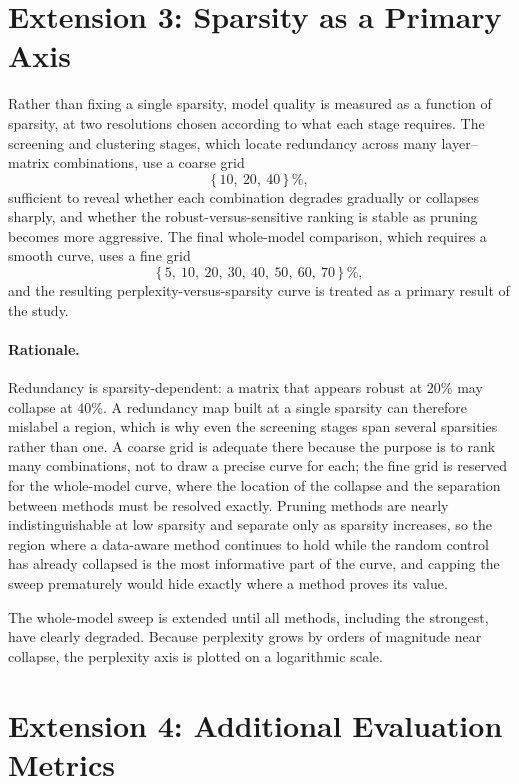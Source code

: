 \documentclass[11pt]{article}
\begin{document}
\section{Extension 3: Sparsity as a Primary Axis}
\label{sec:sparsity}

Rather than fixing a single sparsity, model quality is measured as a function of sparsity, at two
resolutions chosen according to what each stage requires. The screening and clustering stages, which locate
redundancy across many layer--matrix combinations, use a coarse grid
\[
  \{\,10,\ 20,\ 40\,\}\,\%,
\]
sufficient to reveal whether each combination degrades gradually or collapses sharply, and whether the
robust-versus-sensitive ranking is stable as pruning becomes more aggressive. The final whole-model
comparison, which requires a smooth curve, uses a fine grid
\[
  \{\,5,\ 10,\ 20,\ 30,\ 40,\ 50,\ 60,\ 70\,\}\,\%,
\]
and the resulting perplexity-versus-sparsity curve is treated as a primary result of the study.

\paragraph{Rationale.} Redundancy is sparsity-dependent: a matrix that appears robust at 20\% may collapse
at 40\%. A redundancy map built at a single sparsity can therefore mislabel a region, which is why even the
screening stages span several sparsities rather than one. A coarse grid is adequate there because the
purpose is to rank many combinations, not to draw a precise curve for each; the fine grid is reserved for
the whole-model curve, where the location of the collapse and the separation between methods must be
resolved exactly. Pruning methods are nearly indistinguishable at low sparsity and separate only as sparsity
increases, so the region where a data-aware method continues to hold while the random control has already
collapsed is the most informative part of the curve, and capping the sweep prematurely would hide exactly
where a method proves its value.

The whole-model sweep is extended until all methods, including the strongest, have clearly degraded. Because
perplexity grows by orders of magnitude near collapse, the perplexity axis is plotted on a logarithmic scale.

\section{Extension 4: Additional Evaluation Metrics}
\label{sec:eval}
\end{document}

